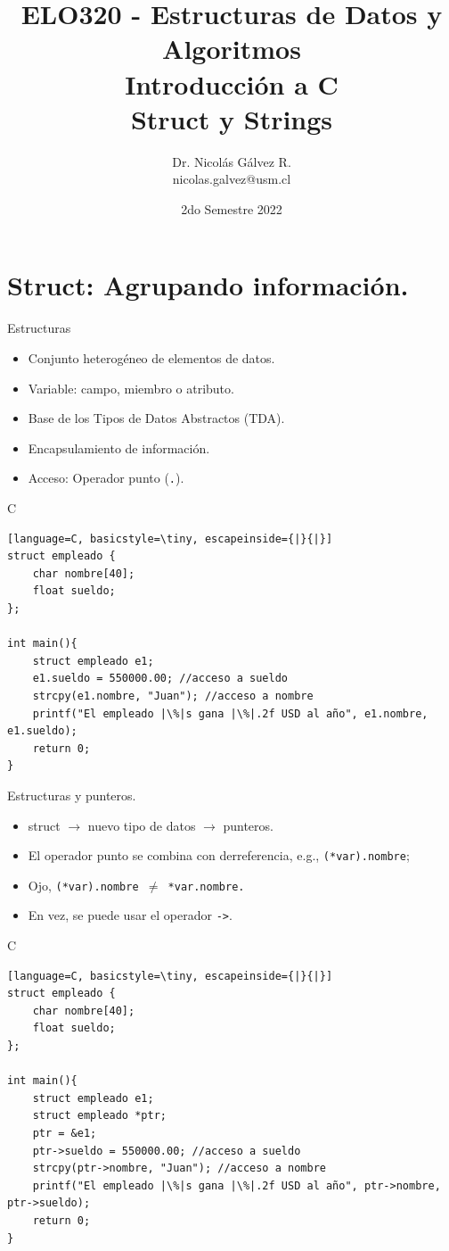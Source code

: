 \documentclass{beamer}
\title{ELO320 - Estructuras de Datos y Algoritmos\\Introducción a C\\Struct y Strings}
\author{Dr. Nicolás Gálvez R.\\{\small nicolas.galvez@usm.cl}}
\institute{Ing. Civil Telemática - Departamento de Electrónica}
\date{2do Semestre 2022}
\begin{document}
\frame{\titlepage}

%
%
\section{Struct: Agrupando información.}
\begin{frame}[fragile]{Estructuras}
\begin{itemize}
	\item Conjunto heterogéneo de elementos de datos.
	\item Variable: campo, miembro o atributo.
	\item Base de los Tipos de Datos Abstractos (TDA).
	\item Encapsulamiento de información.
	\item Acceso: Operador punto (\texttt{.}).
\end{itemize}
\begin{exampleblock}{C}
\begin{lstlisting}[language=C, basicstyle=\tiny, escapeinside={|}{|}]
struct empleado {
    char nombre[40];
    float sueldo;
};

int main(){
	struct empleado e1;
	e1.sueldo = 550000.00; //acceso a sueldo
	strcpy(e1.nombre, "Juan"); //acceso a nombre
	printf("El empleado |\%|s gana |\%|.2f USD al año", e1.nombre, e1.sueldo); 
	return 0;
}
\end{lstlisting}
\end{exampleblock}
\end{frame}

\begin{frame}[fragile]{Estructuras y punteros.}
\begin{itemize}
	\item struct $\rightarrow$ nuevo tipo de datos $\rightarrow$ punteros.
	\item El operador punto se combina con derreferencia, e.g., \texttt{(*var).nombre};
	\item Ojo, \texttt{(*var).nombre $\neq$ *var.nombre.}
	\item En vez, se puede usar el operador \verb+->+. 
\end{itemize}
\begin{exampleblock}{C}
\begin{lstlisting}[language=C, basicstyle=\tiny, escapeinside={|}{|}]
struct empleado {
    char nombre[40];
    float sueldo;
};

int main(){
	struct empleado e1;
	struct empleado *ptr;
	ptr = &e1;
	ptr->sueldo = 550000.00; //acceso a sueldo
	strcpy(ptr->nombre, "Juan"); //acceso a nombre
	printf("El empleado |\%|s gana |\%|.2f USD al año", ptr->nombre, ptr->sueldo); 
	return 0;
}
\end{lstlisting}
\end{exampleblock}
\end{frame}
\end{document}
